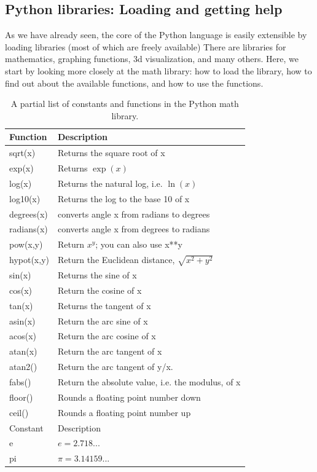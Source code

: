 \subsection{Python libraries: Loading and getting help}
\label{sec:mathlibrary}
As we have already seen, the core of the Python language is easily extensible by loading libraries (most of which are freely available) There are libraries for mathematics, graphing functions, 3d visualization, and many others. Here, we start by looking more closely at the math library: how to load the library, how to find out about the available functions, and how to use the functions. 
%
%
\begin{table}
\centering
\caption{A partial list of constants and functions in the Python math library.}
\label{tab:mathlibrary}       %
\begin{tabular}{ll}
\toprule
Function\hspace*{7mm} & Description  \\
\midrule
sqrt(x) 		&	Returns the square root of x\\
exp(x)		&	Returns $\exp(x)$ \\
log(x)		&	Returns the natural log, i.e. $\ln(x)$\\
log10(x)	&	Returns the log to the base 10 of x \\
degrees(x)	&	converts angle x from radians to degrees\\
radians(x) 	&	converts angle x from degrees to radians\\
pow(x,y)	&	Return $x^y$; you can also use x**y  \\
hypot(x,y)	&	Return the Euclidean distance, $\sqrt{x^2 + y^2}$\\
sin(x)		&	Returns the sine of x\\
cos(x)		&	Return the cosine of x\\
tan(x)		&	Returns the tangent of x\\
asin(x)		&	Return the arc sine of x\\
acos(x)		&	Return the arc cosine of x\\
atan(x)		&	Return the arc tangent of x\\
atan2()		&   Return the arc tangent of y/x.\\
fabs()		&   Return the absolute value, i.e. the modulus, of x\\
floor()		&   Rounds a floating point number down\\
ceil()		&	Rounds a floating point number up\\[5mm]
\midrule
Constant 	& 	Description  \\
\midrule
e			& 	$e=2.718...$\\
pi			&	$\pi=3.14159...$\\
\bottomrule
\end{tabular}
\end{table}
%

